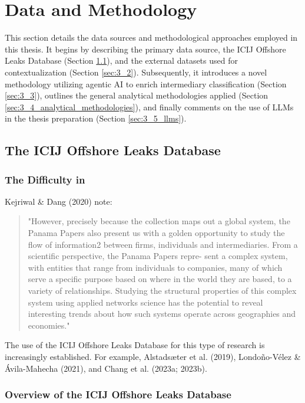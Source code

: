 \chapter{Data and Methodology}
\label{chap:data_methodology}

This section details the data sources and methodological approaches employed in this thesis. It begins by describing the primary data source, the ICIJ Offshore Leaks Database (Section \ref{sec:3_1}), and the external datasets used for contextualization (Section \ref{sec:3_2}). Subsequently, it introduces a novel methodology utilizing agentic AI to enrich intermediary classification (Section \ref{sec:3_3}), outlines the general analytical methodologies applied (Section \ref{sec:3_4_analytical_methodologies}), and finally comments on the use of LLMs in the thesis preparation (Section \ref{sec:3_5_llms}).

\section{The ICIJ Offshore Leaks Database}
\label{sec:3_1}

\subsection{The Difficulty in }

Kejriwal \& Dang (2020) note:

\begin{quote}
"However, precisely because the collection maps out a global system, the Panama Papers also present us with a golden opportunity to study the flow of information2 between firms, individuals and intermediaries. From a scientific perspective, the Panama Papers repre- sent a complex system, with entities that range from individuals to companies, many of which serve a specific purpose based on where in the world they are based, to a variety of relationships. Studying the structural properties of this complex system using applied networks science has the potential to reveal interesting trends about how such systems operate across geographies and economies."
\end{quote}


The use of the ICIJ Offshore Leaks Database for this type of research is increasingly established. For example, Alstadsæter et al. (2019), Londoño-Vélez \& Ávila-Mahecha (2021), and Chang et al. (2023a; 2023b).

\subsection{Overview of the ICIJ Offshore Leaks Database}

